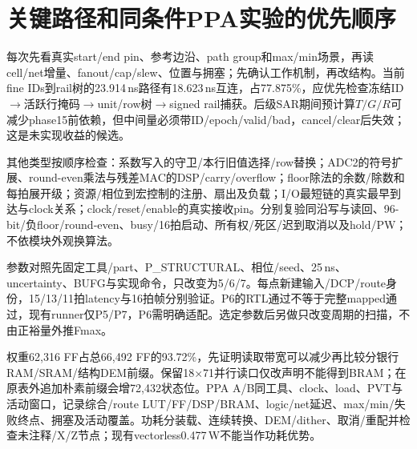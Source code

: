 \section{关键路径和同条件PPA实验的优先顺序}
每次先看真实start/end pin、参考边沿、path group和max/min场景，再读cell/net增量、fanout/cap/slew、位置与拥塞；先确认工作机制，再改结构。当前fine IDs到rail树的23.914\,ns路径有18.623\,ns互连，占77.875\%，应优先检查冻结ID\(\to\)活跃行掩码\(\to\)unit/row树\(\to\)signed rail捕获。后级SAR期间预计算\(T/G/R\)可减少phase15前依赖，但中间量必须带ID/epoch/valid/bad，cancel/clear后失效；这是未实现收益的候选。

其他类型按顺序检查：系数写入的守卫/本行旧值选择/row替换；ADC2的符号扩展、round-even乘法与残差MAC的DSP/carry/overflow；floor除法的余数/除数和每拍展开级；资源/相位到宏控制的注册、扇出及负载；I/O最短链的真实最早到达与clock关系；clock/reset/enable的真实接收pin。分别复验同沿写与读回、96-bit/负floor/round-even、busy/16拍启动、所有权/死区/迟到取消以及hold/PW；不依模块外观换算法。

参数对照先固定工具/part、P\_STRUCTURAL、相位/seed、25\,ns、uncertainty、BUFG与实现命令，只改变为5/6/7。每点新建输入/DCP/route身份，15/13/11拍latency与16拍帧分别验证。P6的RTL通过不等于完整mapped通过，现有runner仅P5/P7，P6需明确适配。选定参数后另做只改变周期的扫描，不由正裕量外推Fmax。

权重62,316 FF占总66,492 FF的93.72\%，先证明读取带宽可以减少再比较分银行RAM/SRAM/结构DEM前缀。保留18\(\times\)71并行读口仅改声明不能得到BRAM；在原表外追加朴素前缀会增72,432状态位。PPA A/B同工具、clock、load、PVT与活动窗口，记录综合/route LUT/FF/DSP/BRAM、logic/net延迟、max/min/失败终点、拥塞及活动覆盖。功耗分装载、连续转换、DEM/dither、取消/重配并检查未注释/X/Z节点；现有vectorless0.477\,W不能当作功耗优势。

